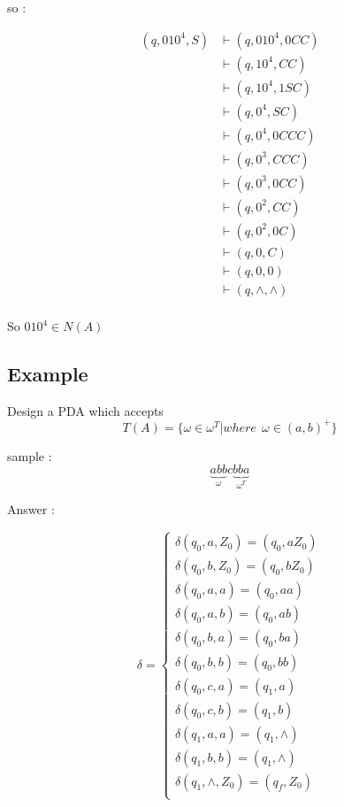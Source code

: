 \documentclass[12pt]{book}
\begin{document}
so : 

\begin{align*}
(q, 010^{4}, S) &\vdash (q, 010^{4}, 0CC) \\
&\vdash (q, 10^{4}, CC) \\
&\vdash (q, 10^{4}, 1SC) \\
&\vdash (q, 0^{4}, SC) \\
&\vdash (q, 0^{4}, 0CCC) \\
&\vdash (q, 0^{3}, CCC) \\
&\vdash (q, 0^{3}, 0CC) \\
&\vdash (q, 0^{2}, CC) \\
&\vdash (q, 0^{2}, 0C) \\
&\vdash (q, 0, C) \\
&\vdash (q, 0, 0) \\
&\vdash (q, \wedge, \wedge) \\
\end{align*}

So $010^{4} \in N(A)$


\subsection{Example}

Design a PDA which accepts
$$
T(A) = \{ \omega \in \omega^{T} | where \:\: \omega \in (a,b)^{+} \}
$$

sample :
$$
\underbrace{abb}_{\omega}c\underbrace{bba}_{\omega^{T}}
$$


Answer :

$$
\delta = 
\begin{cases}
\delta(q_{0},a,Z_{0}) = (q_{0}, aZ_{0}) \\
\delta(q_{0},b,Z_{0}) = (q_{0},bZ_{0}) \\
\delta(q_{0},a,a) = (q_{0},aa) \\
\delta(q_{0},a,b) = (q_{0},ab) \\
\delta(q_{0},b,a) = (q_{0},ba) \\
\delta(q_{0},b,b) = (q_{0},bb) \\
\delta(q_{0},c,a) = (q_{1},a) \\
\delta(q_{0},c,b) = (q_{1},b) \\
\delta(q_{1},a,a) = (q_{1},\wedge) \\
\delta(q_{1},b,b) = (q_{1},\wedge) \\
\delta(q_{1},\wedge,Z_{0}) = (q_{f},Z_{0}) \\
\end{cases}
$$
\end{document}
